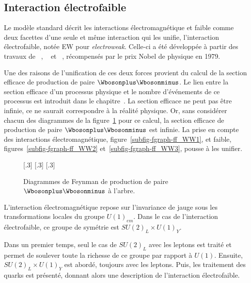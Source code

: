 \subsection{Interaction électrofaible}\label{chapter-MS-MSSM-section-formalisme-subsec-EW}
Le modèle standard décrit les interactions électromagnétique et faible comme deux facettes d'une seule et même interaction qui les unifie, l'interaction électrofaible, notée \og EW \fg{} pour \emph{electroweak}.
Celle-ci a été développée à partir des travaux de \citeauthor{Glashow_EW}~\cite{Glashow_EW}, \citeauthor{Salam_EW}~\cite{Salam_EW} et \citeauthor{Weinberg_leptons_model}~\cite{Weinberg_leptons_model}, récompensés par le prix Nobel de physique en 1979.
\par Une des raisons de l'unification de ces deux forces provient du calcul de la section efficace de production de paire $\Wbosonplus\Wbosonminus$.
Le lien entre la section efficace d'un processus physique et le nombre d'événements de ce processus est introduit dans le chapitre~.
La section efficace ne peut pas être infinie, ce ne saurait correspondre à la réalité physique.
Or, sans considérer chacun des diagrammes de la figure~\ref{fig-fgraph-ff_WW} pour ce calcul,
la section efficace de production de paire $\Wbosonplus\Wbosonminus$ est infinie.
La prise en compte des interactions électromagnétique, figure~\ref{subfig-fgraph-ff_WW1},
et faible, figures~\ref{subfig-fgraph-ff_WW2} et~\ref{subfig-fgraph-ff_WW3},
pousse à les unifier.
\begin{figure}[h]
\centering
\vspace{\baselineskip}
\subcaptionbox{\label{subfig-fgraph-ff_WW1}}[.3\textwidth]
{\vspace{\baselineskip}}
\hfill
\subcaptionbox{\label{subfig-fgraph-ff_WW2}}[.3\textwidth]
{\vspace{\baselineskip}}
\hfill
\subcaptionbox{\label{subfig-fgraph-ff_WW3}}[.3\textwidth]
{\vspace{\baselineskip}}

\caption{Diagrammes de Feynman de production de paire $\Wbosonplus\Wbosonminus$ à l'arbre.}
\label{fig-fgraph-ff_WW}
\end{figure}
\par L'interaction électromagnétique repose sur l'invariance de jauge sous les transformations locales du groupe $U(1)_{em}$.
Dans le cas de l'interaction électrofaible, ce groupe de symétrie est $SU(2)_L \times U(1)_Y$.
\par
Dans un premier temps, seul le cas de $SU(2)_L$ avec les leptons est traité et permet de soulever toute la richesse de ce groupe par rapport à $U(1)$.
Ensuite, $SU(2)_L \times U(1)_Y$ est abordé, toujours avec les leptons.
Puis, les traitement des quarks est présenté, donnant alors une description de l'interaction électrofaible.
